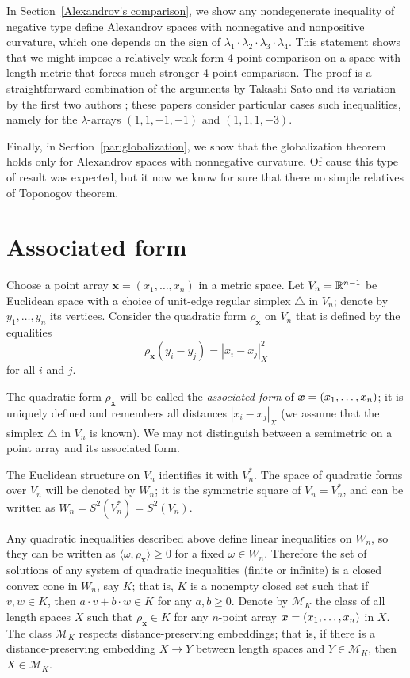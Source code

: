 \documentclass[a4paper,10pt]{article}
\begin{document}
In Section~\ref{Alexandrov's comparison}, we show any nondegenerate inequality of negative type define Alexandrov spaces with nonnegative and nonpositive curvature,
which one depends on the sign of $\lambda_1\cdot\lambda_2\cdot\lambda_3\cdot\lambda_4$.
This statement shows that we might impose a relatively weak form 4-point comparison on a space with length metric that forces much stronger 4-point comparison.
The proof is a straightforward combination of the arguments by Takashi Sato \cite{sato} and its variation by the first two authors \cite{lebedeva-petrunin-2010};
these papers consider particular cases such inequalities, namely for the $\lambda$-arrays $(1,1,-1,-1)$ and $(1,1,1,-3)$.

Finally, in Section~\ref{par:globalization}, we show that the globalization theorem holds only for Alexandrov spaces with nonnegative curvature.
Of cause this type of result was expected, but it now we know for sure that there no simple relatives of Toponogov theorem.

\section{Associated form}\label{Associated form}

Choose a point array $\bm{x}=(x_1,\dots,x_n)$ in a metric space.
Let $V_n\z=\RR^{n-1}$ be Euclidean space with a choice of unit-edge regular simplex $\triangle$ in $V_n$; denote by $y_1,\dots,y_n$ its vertices.
Consider the quadratic form $\rho_{\bm{x}}$ on $V_n$ that is defined by the equalities
\[\rho_{\bm{x}}(y_i-y_j)=|x_i-x_j|^2_X\]
for all $i$ and $j$.

The quadratic form $\rho_{\bm{x}}$ will be called the \emph{associated form} of $\bm{x}=(x_1,\z\dots,x_n)$;
it is uniquely defined and remembers all distances $|x_i-x_j|_X$
(we assume that the simplex $\triangle$ in $V_n$ is known).
We may not distinguish between a semimetric on a point array and its associated form.

The Euclidean structure on $V_n$ identifies it with $V_n^*$.
The space of quadratic forms over $V_n$ will be denoted by $W_n$;
it is the symmetric square of $V_n=V_n^*$, and can be written as $W_n=S^2(V_n^*)=S^2(V_n)$.

Any quadratic inequalities described above define linear inequalities on $W_n$, so they can be written as $\langle\omega,\rho_{\bm{x}}\rangle\ge 0$ for a fixed $\omega\in W_n$.
Therefore the set of solutions of any system of quadratic inequalities (finite or infinite) is a closed convex cone in $W_n$, say $K$;
that is, $K$ is a nonempty closed set such that if $v,w\in K$, then $a\cdot v+b\cdot w\in K$ for any $a,b\ge0$.
Denote by $\mathcal{M}_K$ the class of all length spaces $X$ such that
$\rho_{\bm{x}}\in K$ for any $n$-point array $\bm{x}\z=(x_1,\dots,x_n)$ in $X$.
The class $\mathcal{M}_K$ respects distance-preserving embeddings; that is,
if there is a distance-preserving embedding $X\to Y$ between length spaces and $Y \in  \mathcal{M}_K$, then $X\in \mathcal{M}_K$.
\end{document}
